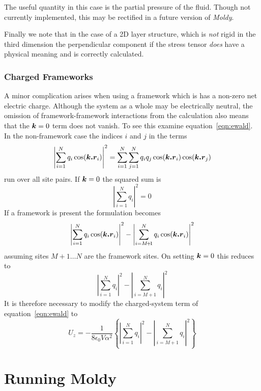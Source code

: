 \documentclass[twoside]{report}
\newcommand{\moldy}{{\em Moldy}}
\newcommand{\bm}[1]{\mbox{\boldmath \protect\(#1\protect\)}}
\begin{document}
The useful quantity in this case is the partial pressure of the
fluid.  Though not currently implemented, this may be rectified in a
future version of \moldy.

Finally we note that in the case of a 2D layer structure, which is
{\em not\/} rigid in the third dimension the perpendicular component if
the stress tensor {\em does\/} have a physical meaning and is correctly
calculated. 
 
\subsection{Charged Frameworks}
A minor complication arises when using a framework which is has a
non-zero net electric charge.  Although the system as a whole may be
electrically neutral, the omission of  framework-framework
interactions from the calculation also means that the
$\bm{k}=0$ term does not vanish.  To see this examine
equation~\ref{eqn:ewald}.  In the non-framework case the indices $i$
and $j$ in the terms
\begin{displaymath}
\left | \sum_{i=1}^{N} q_i \cos(\bm{k.r}_i) \right |^2 
=
\sum_{i=1}^{N} \sum_{j=1}^{N} q_i q_j \cos(\bm{k.r}_i)\cos(\bm{k.r}_j)
\end{displaymath}
run over all site pairs.  If $\bm{k}=0$
the squared sum is 
\begin{displaymath}
\left | \sum_{i=1}^{N} q_i \right |^2 = 0
\end{displaymath}
If a framework is present the formulation becomes
\begin{displaymath}
\left | \sum_{i=1}^{N} q_i \cos(\bm{k.r}_i) \right |^2 
-
\left | \sum_{i=M\!+\!1}^{N} q_i \cos(\bm{k.r}_i) \right |^2 
\end{displaymath}
assuming sites $M+1 \ldots N$ are the framework sites.  On setting
$\bm{k}=0$ this reduces to
\begin{displaymath}
\left | \sum_{i=1}^N q_i \right |^2 - \left | \sum_{i=M\!+\!1}^N q_i \right |^2
\end{displaymath}
It is therefore necessary to modify the charged-system term of
equation~\ref{eqn:ewald} to
\begin{equation}
U_z = - \frac{1}{8 \epsilon_0 V \alpha^2}
\left \lbrace
\left | \sum_{i=1}^N q_i \right |^2 - \left | \sum_{i=M\!+\!1}^N q_i \right |^2
\right \rbrace
\end{equation}
\chapter{Running Moldy}  %
\end{document}
